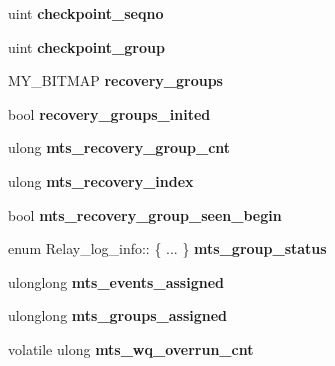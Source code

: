 \begin{DoxyCompactItemize}
uint {\bfseries checkpoint\+\_\+seqno}
\item 
\mbox{\label{classRelay__log__info_a02bba2ccb2b53d74f5b66f8f9999f9c6}} 
uint {\bfseries checkpoint\+\_\+group}
\item 
\mbox{\label{classRelay__log__info_a22bbe2a79ab591ad190b46f463999f8f}} 
M\+Y\+\_\+\+B\+I\+T\+M\+AP {\bfseries recovery\+\_\+groups}
\item 
\mbox{\label{classRelay__log__info_a33483057036d96ba0b3988b8bfa4b140}} 
bool {\bfseries recovery\+\_\+groups\+\_\+inited}
\item 
\mbox{\label{classRelay__log__info_a7944b964e17da951bd50aa65963f282e}} 
ulong {\bfseries mts\+\_\+recovery\+\_\+group\+\_\+cnt}
\item 
\mbox{\label{classRelay__log__info_ad73aa78214cc6b08f3edf7404b343378}} 
ulong {\bfseries mts\+\_\+recovery\+\_\+index}
\item 
\mbox{\label{classRelay__log__info_a6610eb6c3f1e668cf82031f6d4a14e25}} 
bool {\bfseries mts\+\_\+recovery\+\_\+group\+\_\+seen\+\_\+begin}
\item 
\mbox{\label{classRelay__log__info_a172a2b7cafb04e81515148c1248db9cc}} 
enum Relay\+\_\+log\+\_\+info\+:: \{ ... \}  {\bfseries mts\+\_\+group\+\_\+status}
\item 
\mbox{\label{classRelay__log__info_a085cce31f46960cf03b458e908f55e1a}} 
ulonglong {\bfseries mts\+\_\+events\+\_\+assigned}
\item 
\mbox{\label{classRelay__log__info_a25df544328cae076f070b8a133cf35e8}} 
ulonglong {\bfseries mts\+\_\+groups\+\_\+assigned}
\item 
\mbox{\label{classRelay__log__info_a50adac4e8fcd877976d35b3f3fb805dd}} 
volatile ulong {\bfseries mts\+\_\+wq\+\_\+overrun\+\_\+cnt}
\item 
\mbox{\label{classRelay__log__info_a0f7b5f06f937ae5c40eff00d3167eb10}} 

\end{DoxyCompactItemize}
